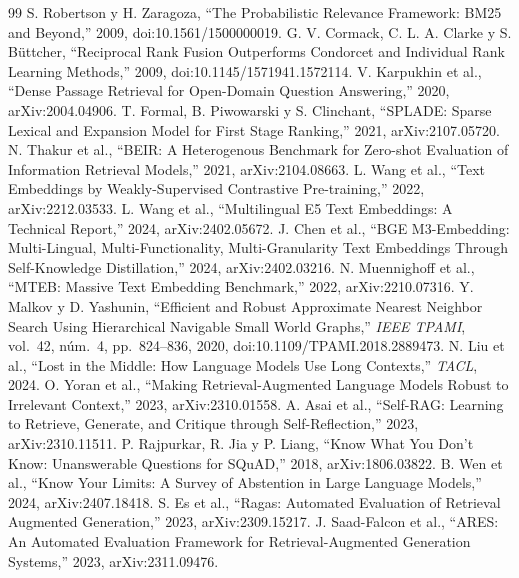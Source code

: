 \documentclass[conference]{IEEEtran}
\begin{document}
\begin{thebibliography}{99}
 S. Robertson y H. Zaragoza, ``The Probabilistic Relevance Framework: BM25 and Beyond,'' 2009, doi:10.1561/1500000019.
 G. V. Cormack, C. L. A. Clarke y S. B\"uttcher, ``Reciprocal Rank Fusion Outperforms Condorcet and Individual Rank Learning Methods,'' 2009, doi:10.1145/1571941.1572114.
 V. Karpukhin et al., ``Dense Passage Retrieval for Open-Domain Question Answering,'' 2020, arXiv:2004.04906.
 T. Formal, B. Piwowarski y S. Clinchant, ``SPLADE: Sparse Lexical and Expansion Model for First Stage Ranking,'' 2021, arXiv:2107.05720.
 N. Thakur et al., ``BEIR: A Heterogenous Benchmark for Zero-shot Evaluation of Information Retrieval Models,'' 2021, arXiv:2104.08663.
 L. Wang et al., ``Text Embeddings by Weakly-Supervised Contrastive Pre-training,'' 2022, arXiv:2212.03533.
 L. Wang et al., ``Multilingual E5 Text Embeddings: A Technical Report,'' 2024, arXiv:2402.05672.
 J. Chen et al., ``BGE M3-Embedding: Multi-Lingual, Multi-Functionality, Multi-Granularity Text Embeddings Through Self-Knowledge Distillation,'' 2024, arXiv:2402.03216.
 N. Muennighoff et al., ``MTEB: Massive Text Embedding Benchmark,'' 2022, arXiv:2210.07316.
 Y. Malkov y D. Yashunin, ``Efficient and Robust Approximate Nearest Neighbor Search Using Hierarchical Navigable Small World Graphs,'' \textit{IEEE TPAMI}, vol.~42, núm.~4, pp.~824--836, 2020, doi:10.1109/TPAMI.2018.2889473.
 N. Liu et al., ``Lost in the Middle: How Language Models Use Long Contexts,'' \textit{TACL}, 2024.
 O. Yoran et al., ``Making Retrieval-Augmented Language Models Robust to Irrelevant Context,'' 2023, arXiv:2310.01558.
 A. Asai et al., ``Self-RAG: Learning to Retrieve, Generate, and Critique through Self-Reflection,'' 2023, arXiv:2310.11511.
 P. Rajpurkar, R. Jia y P. Liang, ``Know What You Don't Know: Unanswerable Questions for SQuAD,'' 2018, arXiv:1806.03822.
 B. Wen et al., ``Know Your Limits: A Survey of Abstention in Large Language Models,'' 2024, arXiv:2407.18418.
 S. Es et al., ``Ragas: Automated Evaluation of Retrieval Augmented Generation,'' 2023, arXiv:2309.15217.
 J. Saad-Falcon et al., ``ARES: An Automated Evaluation Framework for Retrieval-Augmented Generation Systems,'' 2023, arXiv:2311.09476.

\end{thebibliography}
\end{document}
